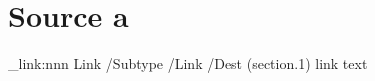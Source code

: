\documentclass{article}
\begin{document}
\section{Source a}

\newpage 
\ExplSyntaxOn
\pdfannot_link:nnn { Link }
{
 /Subtype /Link
 /Dest (section.1)
}
{ link text}
\ExplSyntaxOff
\end{document}

